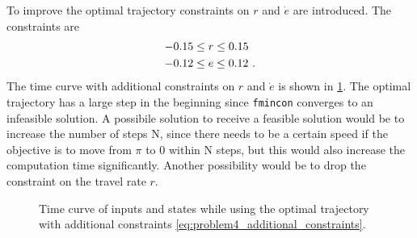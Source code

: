 To improve the optimal trajectory constraints on $r$ and $\dot{e}$ are introduced. The constraints are
\begin{subequations}
	\begin{align}
	-0.15&\leq r\leq0.15\\
	-0.12&\leq e\leq0.12\FullStop
	\end{align}
	\label{eq:problem4_additional_constraints}%
\end{subequations}
The time curve with additional constraints on $r$ and $\dot{e}$ is shown in \cref{fig:LQR_bothconstraintsN=60}. The optimal trajectory has a large step in the beginning since \verb|fmincon| converges to an infeasible solution. A possibile solution to receive a feasible solution would be to increase the number of steps N, since there needs to be a certain speed if the objective is to move from $\pi$ to 0 within N steps, but this would also increase the computation time significantly. Another possibility would be to drop the constraint on the travel rate $r$. 

\begin{figure}[htbp]
	\centering
	\caption{Time curve of inputs and states while using the optimal trajectory with additional constraints \eqref{eq:problem4_additional_constraints}.}
	\label{fig:LQR_bothconstraintsN=60}%
\end{figure}


